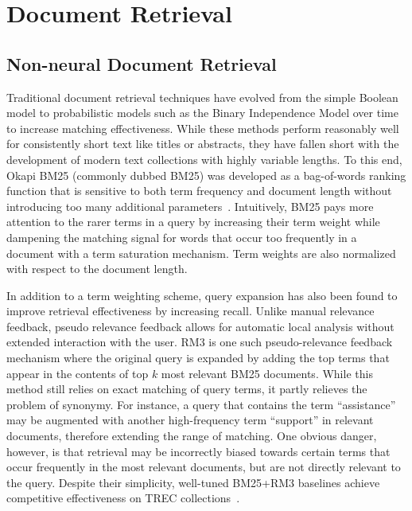 \section{Document Retrieval}

\subsection{Non-neural Document Retrieval}
\label{non-neural-retrieval}

Traditional document retrieval techniques have evolved from the simple Boolean model to probabilistic models such as the Binary Independence Model over time to increase matching effectiveness.
While these methods perform reasonably well for consistently short text like titles or abstracts, they have fallen short with the development of modern text collections with highly variable lengths.
To this end, Okapi BM25 (commonly dubbed BM25) was developed as a bag-of-words ranking function that is sensitive to both term frequency and document length without introducing too many additional parameters~\cite{jones2000probabilistic}.
Intuitively, BM25 pays more attention to the rarer terms in a query by increasing their term weight while dampening the matching signal for words that occur too frequently in a document with a term saturation mechanism.
Term weights are also normalized with respect to the document length.

In addition to a term weighting scheme, query expansion has also been found to improve retrieval effectiveness by increasing recall.
Unlike manual relevance feedback, pseudo relevance feedback allows for automatic local analysis without extended interaction with the user.
RM3 is one such pseudo-relevance feedback mechanism where the original query is expanded by adding the top terms that appear in the contents of top $ k $ most relevant BM25 documents.
While this method still relies on exact matching of query terms, it partly relieves the problem of synonymy.
For instance, a query that contains the term ``assistance'' may be augmented with another high-frequency term ``support'' in relevant documents, therefore extending the range of matching.
One obvious danger, however, is that retrieval may be incorrectly biased towards certain terms that occur frequently in the most relevant documents, but are not directly relevant to the query.
Despite their simplicity, well-tuned BM25+RM3 baselines achieve competitive effectiveness on TREC collections~\cite{lin2019neural}.

